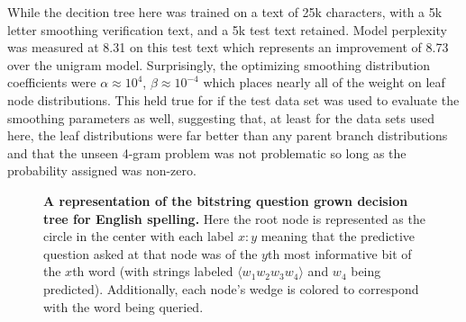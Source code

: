 \documentclass[12pt]{article}
\begin{document}
While the decition tree here was trained on a text of 25k characters,
with a 5k letter smoothing verification text, and a 5k test text
retained. Model perplexity was measured at 8.31 on this test text
which represents an improvement of 8.73 over the unigram
model. Surprisingly, the optimizing smoothing distribution
coefficients were $\alpha \approx 10^{4}$, $\beta \approx 10^{-4}$ which places
nearly all of the weight on leaf node distributions. This held true
for if the test data set was used to evaluate the smoothing parameters
as well, suggesting that, at least for the data sets used here, the
leaf distributions were far better than any parent branch
distributions and that the unseen 4-gram problem was not problematic
so long as the probability assigned was non-zero.


\begin{figure}
  \centering
  \vspace{-1in}
  \caption{\textbf{A representation of the bitstring question grown
      decision tree for English spelling.} Here the root node is
    represented as the circle in the center with each label $x:y$
    meaning that the predictive question asked at that node was of the
    $y$th most informative bit of the $x$th word (with strings labeled
    $\langle w_1 w_2 w_3 w_4 \rangle$ and $w_4$ being
    predicted). Additionally, each node's wedge is colored to
    correspond with the word being queried.}
  \label{fig:bs_wedges}
\end{figure}
\end{document}
